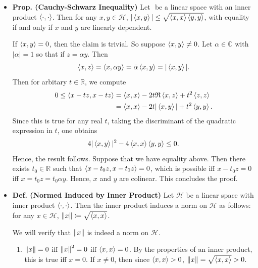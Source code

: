\documentclass{article}
\begin{document}
\begin{itemize}
	\item \textbf{Prop. (Cauchy-Schwarz Inequality)} Let $\mathscr{}$ be a linear space with an inner product $\braket{\cdot,\cdot}$. Then for any $x, y\in \mathscr{H}$, $|\braket{x,y}| \leq \sqrt{\braket{x,x} \braket{y,y}}$, with equality if and only if $x$ and $y$ are linearly dependent. \newline 
	\begin{solutions}
		If $\braket{x,y} = 0$, then the claim is trivial. So suppose $\braket{x,y} \neq 0$. Let $\alpha \in \mathbb{C}$ with $|\alpha| = 1$ so that if $z = \alpha y$. Then 
		\begin{equation}
			\braket{x, z} = \braket{x,\alpha y} = \bar{\alpha}\braket{x,y} = |\braket{x,y}|. 
		\end{equation} 
		Then for arbitary $t \in \mathbb{R}$, we compute 
		\begin{align}
			\begin{split} 
				0 \leq \braket{x - tz, x - tz} &=\braket{x,x} -2t\mathfrak{R}\braket{x,z} + t^{2}\braket{z,z} \\				
				&= \braket{x,x} - 2t|\braket{x,y}| + t^{2}\braket{y,y}. 
			\end{split} 
		\end{align}
		Since this is true for any real $t$, taking the discriminant of the quadratic expression in $t$, one obtains 
		\begin{equation}
			4|\braket{x,y}|^{2} - 4\braket{x,x}\braket{y,y} \leq 0. 
		\end{equation}
		Hence, the result follows. Suppose that we have equality above. Then there exists $t_{0}\in \mathbb{R}$ such that $\braket{x - t_{0}z, x - t_{0}z} = 0$, which is possible iff $x - t_{0}z = 0$ iff $x = t_{0}z = t_{0}\alpha y$. Hence, $x$ and $y$ are colinear. This concludes the proof. 
	\end{solutions}
	\item \textbf{Def. (Normed Induced by Inner Product)} Let $\mathscr{H}$ be a linear space with inner product $\braket{\cdot,\cdot}$. Then the inner product induces a norm on $\mathscr{H}$ as follows: for any $x \in \mathscr{H}$, $\left\Vert x \right\Vert \coloneqq \sqrt{\braket{x,x}}$. \newline 
	\begin{solutions}
		We will verify that $\left\Vert x \right\Vert$ is indeed a norm on $\mathscr{H}$. 
		\begin{enumerate}[itemsep =-2pt,label = (\arabic{*})]
			\item $\left\Vert x \right\Vert = 0$ iff $\left\Vert x \right\Vert^{2} = 0$ iff $\braket{x, x} = 0$. By the properties of an inner product, this is true iff $x =  0$. If $x \neq 0$, then since $\braket{x,x} > 0$, $\left\Vert x \right\Vert = \sqrt{\braket{x,x}} > 0$. 

\end{enumerate}
\end{solutions}
\end{itemize}
\end{document}
